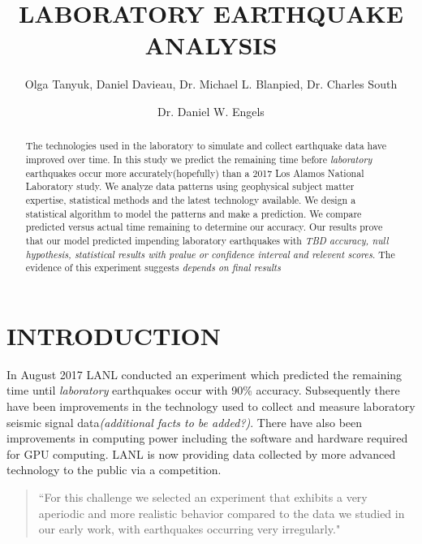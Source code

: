 \documentclass[]{llncs}
\begin{document}

\title{LABORATORY EARTHQUAKE ANALYSIS}

\author{Olga Tanyuk, Daniel Davieau, Dr. Michael L. Blanpied, Dr. Charles South \and Dr. Daniel W. Engels}


\maketitle

\begin{abstract}
The technologies used in the laboratory to simulate and collect earthquake data have improved over time. In this study we predict the remaining time before {\em laboratory} earthquakes occur more accurately(hopefully) than a 2017 Los Alamos National Laboratory study\cite{Bertrand}.  We analyze data patterns using geophysical subject matter expertise, statistical methods and the latest technology available. We design a statistical algorithm to model the patterns and make a prediction. We compare predicted versus actual time remaining to determine our accuracy.
Our results prove that our model predicted impending laboratory earthquakes with {\em TBD accuracy, null hypothesis, statistical results with pvalue or confidence interval and relevent scores}.
The evidence of this experiment suggests {\em depends on final results}

\end{abstract}
\section{INTRODUCTION}
In August 2017 LANL conducted an experiment\cite{Bertrand} which predicted the remaining time until \emph{laboratory} earthquakes occur with 90\% accuracy. Subsequently there have been improvements in the technology used to collect and measure laboratory seismic signal data{\em (additional facts to be added?)}. There have also been improvements in computing power including the software and hardware required for GPU computing. LANL is now providing data collected by more advanced technology to the public via a competition.
\begin{quote}
	“For this challenge we selected an experiment that exhibits a very aperiodic and more realistic behavior compared to the data we studied in our early work, with earthquakes occurring very irregularly.\cite{kaggle}" 
\end{quote}
\end{document}
